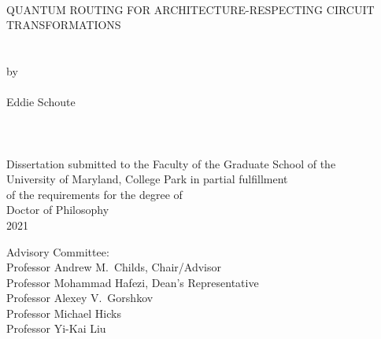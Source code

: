 \hbox{\ }
\vspace{1in}
\begin{center}

\large{{QUANTUM ROUTING FOR ARCHITECTURE-RESPECTING CIRCUIT TRANSFORMATIONS}}\\
\ \\
\ \\
\large{by} \\
\ \\
\large{Eddie Schoute}%
\ \\
\ \\
\ \\
\ \\
\normalsize
Dissertation submitted to the Faculty of the Graduate School of the \\
University of Maryland, College Park in partial fulfillment \\
of the requirements for the degree of \\
Doctor of Philosophy \\
2021
\end{center}

\vspace{7.5em}

\noindent Advisory Committee: \\
Professor Andrew M.\ Childs, Chair/Advisor \\
Professor Mohammad Hafezi, Dean's Representative \\
Professor Alexey V.\ Gorshkov \\
Professor Michael Hicks \\
Professor Yi-Kai Liu
